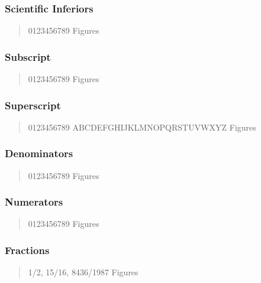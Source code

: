 \subsubsection{Scientific Inferiors}
\begin{quote}
{ 0123456789 Figures}
\end{quote}

\subsubsection{Subscript}
\begin{quote}
{ 0123456789 Figures}
\end{quote}

\subsubsection{Superscript}
\begin{quote}
{ 0123456789 ABCDEFGHIJKLMNOPQRSTUVWXYZ} Figures
\end{quote}

\subsubsection{Denominators}
\begin{quote}
{ 0123456789 Figures}
\end{quote}

\subsubsection{Numerators}
\begin{quote}
{ 0123456789 Figures}
\end{quote}

\subsubsection{Fractions}
\begin{quote}
{ 1/2, 15/16, 8436/1987 Figures}
\end{quote}